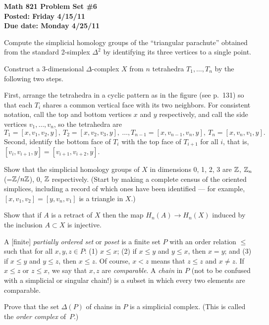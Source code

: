 
\usepackage{youngtab}

\thispagestyle{empty}
{\bf Math 821 Problem Set \#6\\
Posted: Friday 4/15/11\\
Due date: Monday 4/25/11}

\prob [Hatcher p.131 \#4] Compute the simplicial homology groups of
the ``triangular parachute'' obtained from the standard 2-simplex $\Delta^2$
by identifying its three vertices to a single point.


\vfill

\prob [Hatcher p.131 \#8]
Construct a 3-dimensional $\Delta$-complex $X$ from $n$ tetrahedra
$T_1,\dots,T_n$ by the following two steps.

First, arrange the tetrahedra in a cyclic pattern as in the figure (see p.~131)
so that each $T_i$ shares a common vertical face with its two neighbors.
For consistent notation, call the top and bottom vertices
$x$ and $y$ respectively, and call the side vertices
$v_1,\dots,v_n$, so the tetrahedra are
$$T_1=[x,v_1,v_2,y],\ 
T_2=[x,v_2,v_3,y],\ \dots,
T_{n-1}=[x,v_{n-1},v_{n},y],\ 
T_n=[x,v_n,v_1,y].$$
Second, identify the bottom face of $T_i$ with the top face
of $T_{i+1}$ for all $i$, that is, $[v_i,v_{i+1},y]=[v_{i+1},v_{i+2},y]$.

Show that the simplicial homology groups of $X$ in dimensions 0, 1, 2, 3
are $\mathbb{Z}$, $\mathbb{Z}_n$ (=$\mathbb{Z}/n\mathbb{Z}$), $0$, $\mathbb{Z}$ respectively.
(Start by making a complete census of the oriented simplices, including a record of which ones have been identified --- for example, $[x,v_1,v_2]=[y,v_n,v_1]$ is a triangle in $X$.)

\vfill

\prob [Hatcher p.131 \#11] Show that if $A$ is a retract of $X$
then the map $H_n(A)\to H_n(X)$ induced by the inclusion $A\subset X$ is
injective.

\vfill


\prob
A [finite] \emph{partially ordered set} or \emph{poset}
is a finite set $P$ with an order relation $\leq$ such that
for all $x,y,z\in P$:
(1) $x\leq x$;
(2) if $x\leq y$ and $y\leq x$, then $x=y$; and
(3) if $x\leq y$ and $y\leq z$, then $x\leq z$.
Of course, $x<z$ means that $z\leq z$ and $x\neq z$.
If $x\leq z$ or $z\leq x$, we say that $x,z$ are \emph{comparable}.
A \emph{chain} in $P$ (not to be confused with a simplicial or singular chain!)
is a subset in which every two elements are comparable.

\probpart Prove that the set $\Delta(P)$ of chains in $P$ is a simplicial complex.
(This is called the \emph{order complex} of~$P$.)


